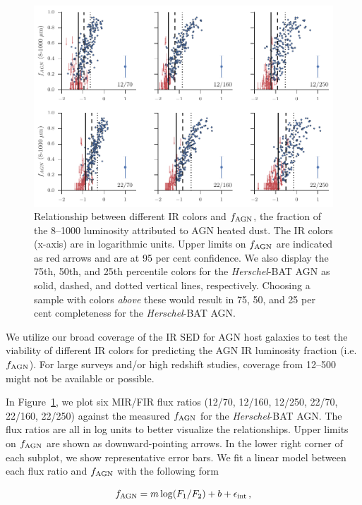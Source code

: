 \documentclass[fleqn, usenatbib]{mnras}
\newcommand{\herschel}{\emph{Herschel}}
\begin{document}
\begin{figure}
\includegraphics[width=\textwidth]{figures/agnfrac_vs_flux_ratio}
\caption{Relationship between different IR colors and $f_{\rm AGN}$, the fraction of the 8--1000 \micron{} luminosity attributed to AGN heated dust. The IR colors (x-axis) are in logarithmic units. Upper limits on $f_{\rm AGN}$ are indicated as red arrows and are at 95 per cent confidence. We also display the 75th, 50th, and 25th percentile colors for the \herschel-BAT AGN as solid, dashed, and dotted vertical lines, respectively. Choosing a sample with colors \textit{above} these would result in 75, 50, and 25 per cent completeness for the \herschel-BAT AGN. \label{fig:agnfrac_vs_flux_ratio}}
\end{figure}

We utilize our broad coverage of the IR SED for AGN host galaxies to test the viability of different IR colors for predicting the AGN IR luminosity fraction (i.e. $f_{\rm AGN}$). For large surveys and/or high redshift studies, coverage from 12--500 \micron{} might not be available or possible.

In Figure~\ref{fig:agnfrac_vs_flux_ratio}, we plot six MIR/FIR flux ratios (12/70, 12/160, 12/250, 22/70, 22/160, 22/250) against the measured $f_{\rm AGN}$ for the \herschel-BAT AGN. The flux ratios are all in log units to better visualize the relationships. Upper limits on $f_{\rm AGN}$ are shown as downward-pointing arrows. In the lower right corner of each subplot, we show representative error bars. We fit a linear model between each flux ratio and $f_{\rm AGN}$ with the following form

\begin{equation}
f_{\rm AGN} = m\log(F_{1}/F_{2}) + b + \epsilon_{\rm int}\,,
\end{equation}
\end{document}
